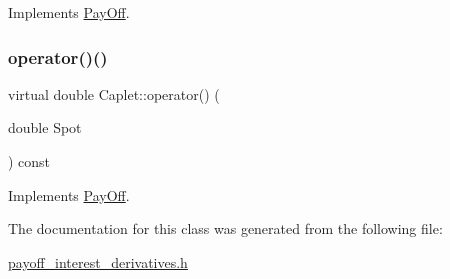 Implements \hyperlink{classPayOff_ad8194d5b82247ae89c25c515f0ba806a}{Pay\+Off}.

\hypertarget{classCaplet_a6b75d621f3c7631b50b7486306466daa}{}\label{classCaplet_a6b75d621f3c7631b50b7486306466daa} 
\subsubsection{\texorpdfstring{operator()()}{operator()()}}
{\footnotesize\ttfamily virtual double Caplet\+::operator() (\begin{DoxyParamCaption}\item[{double}]{Spot }\end{DoxyParamCaption}) const\hspace{0.3cm}{\ttfamily [virtual]}}



Implements \hyperlink{classPayOff_a5ae17d82c233ef5568c8fb0539703000}{Pay\+Off}.



The documentation for this class was generated from the following file\+:\begin{DoxyCompactItemize}
\item 
\hyperlink{payoff__interest__derivatives_8h}{payoff\+\_\+interest\+\_\+derivatives.\+h}\end{DoxyCompactItemize}
